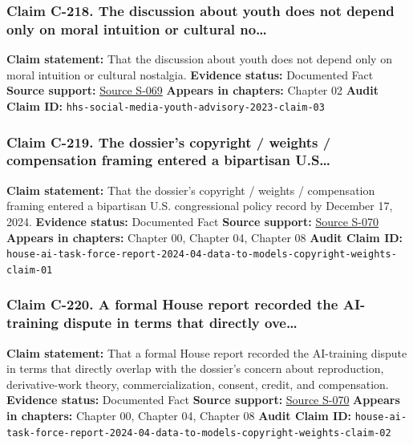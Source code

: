 \documentclass[
  american,
  11pt,
  letterpaper,
]{article}
\begin{document}
\subsubsection{Claim C-218. The discussion about youth does not depend
only on moral intuition or cultural
no\ldots{}}\label{claim-c-218-the-discussion-about-youth-does-not-depend-only-on-moral-intuition-or-cultural-no}

\textbf{Claim statement:} That the discussion about youth does not
depend only on moral intuition or cultural nostalgia. \textbf{Evidence
status:} Documented Fact \textbf{Source support:}
\hyperref[source-s-069-social-media-and-youth-mental-health-the-u-s-surgeon-general-s-advisory]{Source
S-069} \textbf{Appears in chapters:} Chapter 02 \textbf{Audit Claim ID:}
\texttt{hhs-social-media-youth-advisory-2023-claim-03}

\subsubsection{Claim C-219. The dossier's copyright / weights /
compensation framing entered a bipartisan
U.S\ldots{}}\label{claim-c-219-the-dossier-s-copyright-weights-compensation-framing-entered-a-bipartisan-u-s}

\textbf{Claim statement:} That the dossier's copyright / weights /
compensation framing entered a bipartisan U.S. congressional policy
record by December 17, 2024. \textbf{Evidence status:} Documented Fact
\textbf{Source support:}
\hyperref[source-s-070-bipartisan-house-task-force-report-on-artificial-intelligence]{Source
S-070} \textbf{Appears in chapters:} Chapter 00, Chapter 04, Chapter 08
\textbf{Audit Claim ID:}
\texttt{house-ai-task-force-report-2024-04-data-to-models-copyright-weights-claim-01}

\subsubsection{Claim C-220. A formal House report recorded the
AI-training dispute in terms that directly
ove\ldots{}}\label{claim-c-220-a-formal-house-report-recorded-the-ai-training-dispute-in-terms-that-directly-ove}

\textbf{Claim statement:} That a formal House report recorded the
AI-training dispute in terms that directly overlap with the dossier's
concern about reproduction, derivative-work theory, commercialization,
consent, credit, and compensation. \textbf{Evidence status:} Documented
Fact \textbf{Source support:}
\hyperref[source-s-070-bipartisan-house-task-force-report-on-artificial-intelligence]{Source
S-070} \textbf{Appears in chapters:} Chapter 00, Chapter 04, Chapter 08
\textbf{Audit Claim ID:}
\texttt{house-ai-task-force-report-2024-04-data-to-models-copyright-weights-claim-02}
\end{document}
